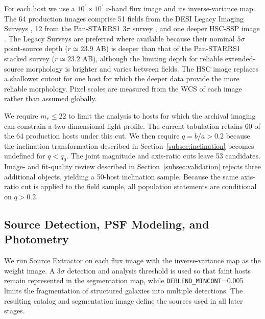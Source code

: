 \documentclass[10pt,twocolumn]{article}
\newcommand{\arcmin}{^{\prime}}
\begin{document}
For each host we use a $10\arcmin\times10\arcmin$ $r$-band flux image and its
inverse-variance map.  The 64 production images comprise 51 fields from the
DESI Legacy Imaging Surveys \citep{2019AJ....157..168D}, 12 from the
Pan-STARRS1 $3\pi$ survey \citep{2016arXiv161205560C}, and one deeper
HSC-SSP image \citep{Aihara2019}.  The Legacy Surveys are preferred where
available because their nominal $5\sigma$ point-source depth
($r\simeq23.9$ AB) is deeper than that of the Pan-STARRS1 stacked survey
($r\simeq23.2$ AB), although the limiting depth for reliable extended-source
morphology is brighter and varies between fields.  The HSC image replaces a
shallower cutout for one host for which the deeper data provide the more
reliable morphology.  Pixel scales are measured from the WCS of each image
rather than assumed globally.

We require $m_r\leq22$ to limit the analysis to hosts for which the archival
imaging can constrain a two-dimensional light profile.  The current
tabulation retains 60 of the 64 production hosts under this cut.  We then
require $q=b/a>0.2$ because the inclination transformation described in
Section~\ref{subsec:inclination} becomes undefined for $q<q_0$.  The joint
magnitude and axis-ratio cuts leave 53 candidates.  Image- and fit-quality
review described in Section~\ref{subsec:validation} rejects three additional
objects, yielding a 50-host inclination sample.  Because the same axis-ratio
cut is applied to the field sample, all population statements are conditional
on $q>0.2$.


\subsection{Source Detection, PSF Modeling, and Photometry}
\label{subsec:detection_psf}

We run Source Extractor \citep{1996A&AS..117..393B} on each flux image with
the inverse-variance map as the weight image.  A $3\sigma$ detection and
analysis threshold is used so that faint hosts remain represented in the
segmentation map, while \texttt{DEBLEND\_MINCONT}=0.005 limits the
fragmentation of structured galaxies into multiple detections.  The resulting
catalog and segmentation image define the sources used in all later stages.
\end{document}
